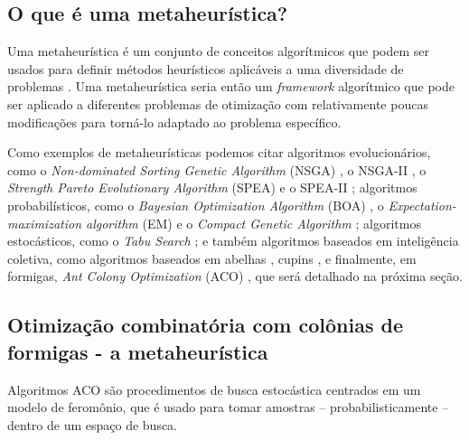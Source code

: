 \subsection{O que é uma metaheurística?}
Uma metaheurística é um conjunto de conceitos algorítmicos que podem ser usados
para definir métodos heurísticos aplicáveis a uma diversidade de problemas
\cite{975277}. Uma metaheurística seria então um \textit{framework} algorítmico
que pode ser aplicado a diferentes problemas de otimização com relativamente
poucas modificações para torná-lo adaptado ao problema específico.

Como exemplos de metaheurísticas podemos citar algoritmos evolucionários, como
o \textit{Non-dominated Sorting Genetic Algorithm} (NSGA)
\cite{Srinivas94multiobjectiveoptimization}, o NSGA-II \cite{deb2002fast}, o
\textit{Strength Pareto Evolutionary Algorithm} (SPEA)
\cite{zitzler1998evolutionary} e o SPEA-II \cite{zitzler2001spea2}; algoritmos
probabilísticos, como o \textit{Bayesian Optimization Algorithm} (BOA)
\cite{Cantu-Paz98linkageproblem}, o \textit{Expectation-maximization
algorithm} (EM) \cite{moon1996expectation} e o \textit{Compact Genetic
Algorithm} \cite{harik1998compact}; algoritmos estocásticos, como o
\textit{Tabu Search} \cite{glover1990tabu}; e também algoritmos baseados em
inteligência coletiva, como algoritmos baseados em abelhas
\cite{teodorovic2005bee}, cupins \cite{roth2003termite}, e finalmente, em
formigas, \textit{Ant Colony Optimization} (ACO) \cite{dorigo1992optimization},
que será detalhado na próxima seção.

\subsection{Otimização combinatória com colônias de formigas - a metaheurística}
\label{sec:atsp}
Algoritmos ACO são procedimentos de busca
estocástica centrados em um modelo de feromônio, que é usado para tomar
amostras -- probabilisticamente -- dentro de um espaço de busca.

